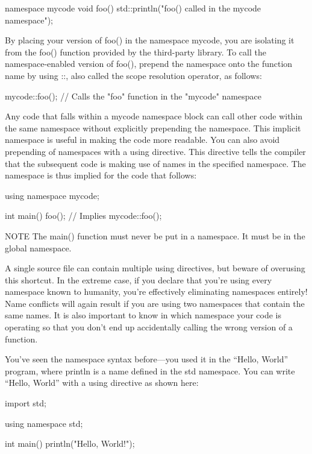 \begin{cpp}
namespace mycode {
    void foo()
    {
        std::println("foo() called in the mycode namespace");
    }
}
\end{cpp}

By placing your version of foo() in the namespace mycode, you are isolating it from the foo() function provided by the third-party library. To call the namespace-enabled version of foo(), prepend the namespace onto the function name by using ::, also called the scope resolution operator, as follows:

\begin{cpp}
mycode::foo(); // Calls the "foo" function in the "mycode" namespace
\end{cpp}

Any code that falls within a mycode namespace block can call other code within the same namespace without explicitly prepending the namespace. This implicit namespace is useful in making the code more readable. You can also avoid prepending of namespaces with a using directive. This directive tells the compiler that the subsequent code is making use of names in the specified namespace. The namespace is thus implied for the code that follows:

\begin{cpp}
using namespace mycode;

int main()
{
    foo(); // Implies mycode::foo();
}
\end{cpp}

\begin{myNotic}{NOTE}
The main() function must never be put in a namespace. It must be in the global namespace.
\end{myNotic}

A single source file can contain multiple using directives, but beware of overusing this shortcut. In the extreme case, if you declare that you’re using every namespace known to humanity, you’re effectively eliminating namespaces entirely! Name conflicts will again result if you are using two namespaces that contain the same names. It is also important to know in which namespace your code is operating so that you don’t end up accidentally calling the wrong version of a function.

You’ve seen the namespace syntax before—you used it in the “Hello, World” program, where println is a name defined in the std namespace. You can write “Hello, World” with a using directive as shown here:

\begin{cpp}
import std;

using namespace std;

int main()
{
    println("Hello, World!");
}
\end{cpp}

